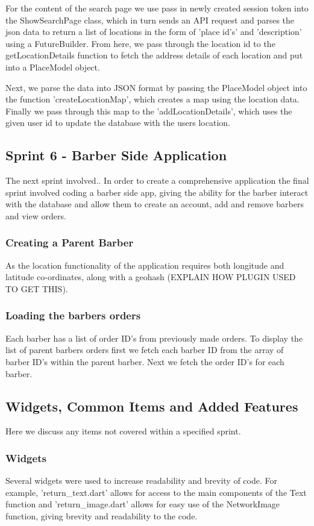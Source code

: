 \documentclass[12pt]{article}
\begin{document}
	For the content of the search page we use pass in newly created session token into the ShowSearchPage class, which in turn sends an API request and parses the json data to return a list of locations in the form of 'place id's' and 'description' using a FutureBuilder. From here, we pass through the location id to the getLocationDetails function to fetch the address details of each location and put into a PlaceModel object.
	
	Next, we parse the data into JSON format by passing the PlaceModel object into the function 'createLocationMap', which creates a map using the location data. Finally we pass through this map to the 'addLocationDetails', which uses the given user id to update the database with the users location.
	
	\subsection{Sprint 6 - Barber Side Application}
	The next sprint involved..
	In order to create a comprehensive application the final sprint involved coding a barber side app, giving the ability for the barber interact with the database and allow them to create an account, add and remove barbers and view orders.
	
	\subsubsection{Creating a Parent Barber}
	As the location functionality of the application requires both longitude and latitude co-ordinates, along with a geohash (EXPLAIN HOW PLUGIN USED TO GET THIS).
	
	\subsubsection{Loading the barbers orders}
	Each barber has a list of order ID's from previously made orders. To display the list of parent barbers orders first we fetch each barber ID from the array of barber ID's within the parent barber. Next we fetch the order ID's for each barber.
	
	\subsection{Widgets, Common Items and Added Features}
	Here we discuss any items not covered within a specified sprint.
	
	\subsubsection{Widgets}
	Several widgets were used to increase readability and brevity of code. For example, 'return\_text.dart' allows for access to the main components of the Text function and 'return\_image.dart' allows for easy use of the NetworkImage function, giving brevity and readability to the code.
	
\end{document}

